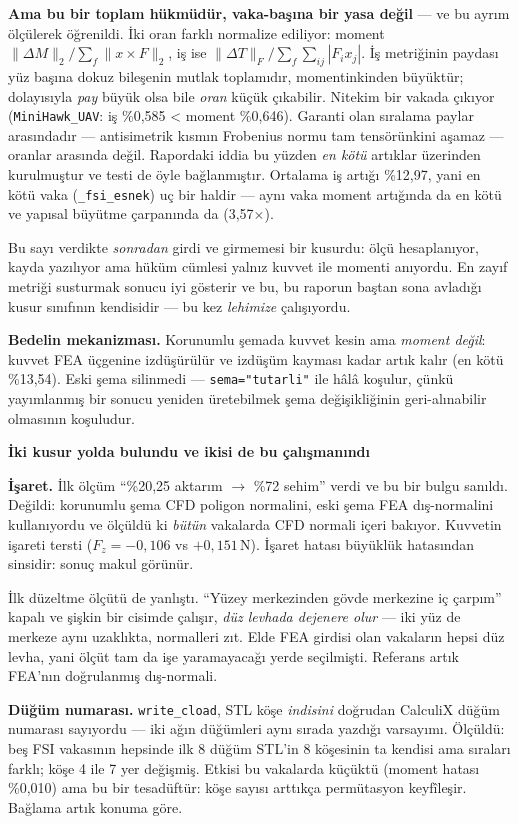 \documentclass[11pt,a4paper]{article}
\newcommand{\kkkenar}{lacivert}
\newcommand{\kkzemin}{kod}
\newenvironment{renkkutu}[3]{%
  \renewcommand{\kkkenar}{#1}\renewcommand{\kkzemin}{#2}%
  \par\medskip\noindent
  \begin{lrbox}{\kutugovde}%
  \begin{minipage}{\dimexpr\linewidth-2\fboxsep-2\fboxrule\relax}\footnotesize
  \textcolor{#1}{\textbf{#3}}\par\vspace{3pt}%
}{%
  \end{minipage}%
  \end{lrbox}%
  \noindent\fcolorbox{\kkkenar}{\kkzemin}{\usebox{\kutugovde}}%
  \par\medskip
}
\newenvironment{dikkat}[1]{\begin{renkkutu}{orta}{ortabg}{#1}}{\end{renkkutu}}
\begin{document}
\noindent \textbf{Ama bu bir toplam hükmüdür, vaka-başına bir yasa değil}
--- ve bu ayrım ölçülerek öğrenildi. İki oran farklı normalize ediliyor:
moment $\|\Delta M\|_2 / \sum_f \|x\times F\|_2$, iş ise
$\|\Delta T\|_F / \sum_f \sum_{ij} |F_i x_j|$. İş metriğinin paydası yüz
başına dokuz bileşenin mutlak toplamıdır, momentinkinden büyüktür;
dolayısıyla \emph{pay} büyük olsa bile \emph{oran} küçük çıkabilir.
Nitekim bir vakada çıkıyor (\texttt{MiniHawk\_UAV}: iş \%0{,}585 <
moment \%0{,}646). Garanti olan sıralama paylar arasındadır ---
antisimetrik kısmın Frobenius normu tam tensörünkini aşamaz --- oranlar
arasında değil. Rapordaki iddia bu yüzden \emph{en kötü} artıklar
üzerinden kurulmuştur ve testi de öyle bağlanmıştır. Ortalama iş artığı \%12{,}97, yani en kötü vaka
(\texttt{\_fsi\_esnek}) uç bir haldir --- aynı vaka moment artığında da
en kötü ve yapısal büyütme çarpanında da (3{,}57$\times$).

\noindent Bu sayı verdikte \emph{sonradan} girdi ve girmemesi bir kusurdu:
ölçü hesaplanıyor, kayda yazılıyor ama hüküm cümlesi yalnız kuvvet ile
momenti anıyordu. En zayıf metriği susturmak sonucu iyi gösterir ve bu, bu
raporun baştan sona avladığı kusur sınıfının kendisidir --- bu kez
\emph{lehimize} çalışıyordu.

\textbf{Bedelin mekanizması.} Korunumlu şemada kuvvet kesin ama
\emph{moment değil}: kuvvet FEA üçgenine izdüşürülür ve izdüşüm kayması
kadar artık kalır
(en kötü \%13{,}54). Eski şema silinmedi --- \texttt{sema="tutarli"} ile hâlâ
koşulur, çünkü yayımlanmış bir sonucu yeniden üretebilmek şema değişikliğinin
geri-alınabilir olmasının koşuludur.

\begin{dikkat}{İki kusur yolda bulundu ve ikisi de bu çalışmanındı}
\textbf{İşaret.} İlk ölçüm ``\%20,25 aktarım $\rightarrow$ \%72 sehim'' verdi ve
bu bir bulgu sanıldı. Değildi: korunumlu şema CFD poligon normalini, eski şema
FEA dış-normalini kullanıyordu ve ölçüldü ki \emph{bütün} vakalarda CFD normali
içeri bakıyor. Kuvvetin işareti tersti ($F_z = -0{,}106$ vs $+0{,}151$\,N).
İşaret hatası büyüklük hatasından sinsidir: sonuç makul görünür.

İlk düzeltme ölçütü de yanlıştı. ``Yüzey merkezinden gövde merkezine iç
çarpım'' kapalı ve şişkin bir cisimde çalışır, \emph{düz levhada dejenere olur}
--- iki yüz de merkeze aynı uzaklıkta, normalleri zıt. Elde FEA girdisi olan
vakaların hepsi düz levha, yani ölçüt tam da işe yaramayacağı yerde seçilmişti.
Referans artık FEA'nın doğrulanmış dış-normali.

\textbf{Düğüm numarası.} \texttt{write\_cload}, STL köşe \emph{indisini}
doğrudan CalculiX düğüm numarası sayıyordu --- iki ağın düğümleri aynı sırada
yazdığı varsayımı. Ölçüldü: beş FSI vakasının hepsinde ilk 8 düğüm STL'in 8
köşesinin ta kendisi ama sıraları farklı; köşe 4 ile 7 yer değişmiş. Etkisi bu
vakalarda küçüktü (moment hatası \%0{,}010) ama bu bir tesadüftür: köşe sayısı
arttıkça permütasyon keyfîleşir. Bağlama artık konuma göre.
\end{dikkat}
\end{document}
